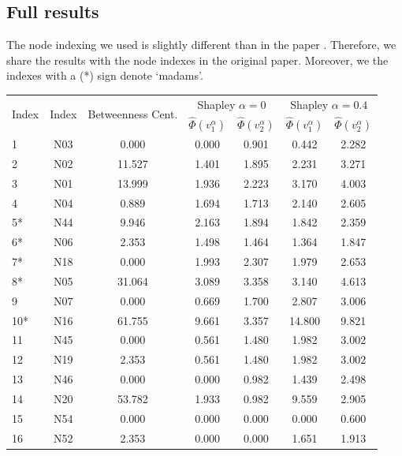 \documentclass[10p]{article}
\theoremstyle{definition}
\theoremstyle{definition}
\begin{document}
\begin{appendices}
\section{Full results} \label{AppendixValues}
The node indexing we used is slightly different than in the paper \cite{mancuso2014not}. Therefore, we share the results with the node indexes in the original paper. Moreover, we the indexes with a (*) sign denote `madams'.
\begin{table}[!ht]\centering
\begin{tabular}{lcccccc}
\toprule
\multirow{2}[3]{*}{Index} & \multirow{2}[3]{*}{\cite{mancuso2014not} Index} &  \multirow{2}[3]{*}{Betweenness Cent.} &\multicolumn{2}{c}{Shapley $\alpha = 0$} & \multicolumn{2}{c}{Shapley $\alpha = 0.4$} \\
\cmidrule(lr){4-5} \cmidrule(lr){6-7}
 & & & $\hat{\Phi}(v_1^\alpha)$ & $\hat{\Phi}(v_2^\alpha)$ & $\hat{\Phi}(v_1^\alpha)$ & $\hat{\Phi}(v_2^\alpha)$ \\
\midrule
1 & N03 & 0.000 & 0.000  &0.901 & 0.442 & 2.282 \\ 
 \hline
 2 & N02 & 11.527 & 1.401 &1.895 & 2.231 & 3.271\\
 \hline
 3 & N01 & 13.999 & 1.936 &2.223 & 3.170 & 4.003\\
 \hline
 4 & N04 & 0.889 & 1.694& 1.713& 2.140 & 2.605\\
 \hline
 5* & N44 & 9.946 & 2.163& 1.894 & 1.842 & 2.359\\
 \hline
 6* & N06 & 2.353 & 1.498&1.464 & 1.364 &1.847\\ 
 \hline
 7* & N18 & 0.000 & 1.993& 2.307& 1.979 & 2.653 \\
 \hline
 8* & N05 & 31.064 & 3.089 &3.358 & 3.140 & 4.613\\
 \hline
 9 & N07 & 0.000 & 0.669& 1.700& 2.807 & 3.006 \\
 \hline
 10* & N16 & 61.755 & 9.661& 3.357&14.800 &  9.821\\
 \hline
 11 & N45 & 0.000 & 0.561& 1.480& 1.982 & 3.002 \\ 
 \hline
 12 & N19 & 2.353 & 0.561&1.480 & 1.982 & 3.002 \\
 \hline
 13 & N46 & 0.000 & 0.000 &0.982& 1.439 &2.498 \\
 \hline
 14 & N20 & 53.782 & 1.933& 0.982& 9.559 & 2.905 \\
 \hline
 15 & N54 & 0.000 & 0.000&  0.000 & 0.000 & 0.600 \\
 \hline
 16 & N52 & 2.353 & 0.000&  0.000& 1.651 &  1.913 \\ 

\end{tabular}
\end{table}
\end{appendices}
\end{document}
